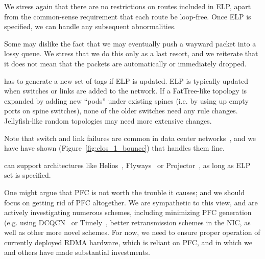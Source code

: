 We stress again that there are no restrictions on routes included in ELP, apart
from the common-sense requirement that each route be loop-free. Once ELP is
specified, we can handle any subsequent abnormalities.

 Some may dislike the fact that we may eventually push
a wayward packet into a lossy queue. We stress that we do this only as a last
resort, and we reiterate that it does not mean that the packets are
automatically or immediately dropped.

 \sysname{} has to generate a new set of tags if ELP is
updated.  ELP is typically updated when switches or links are added to the
network. If a FatTree-like topology is expanded by adding new ``pods'' under
existing spines (i.e. by using up empty ports on spine switches), none of the
older switches need any rule changes.  Jellyfish-like random topologies may need
more extensive changes.

Note that switch and link failures are common in data center
networks~\cite{netpilot}, and we have have shown
(Figure~\ref{fig:clos_1_bounce}) that \sysname{} handles them fine. 

 \sysname{} can support architectures
like Helios~\cite{helios}, Flyways~\cite{flyways} or Projector~\cite{projector},
as long as ELP set is specified.

 One might argue that PFC is not worth the trouble it
causes; and we should focus on getting rid of PFC altogether.  We are
sympathetic to this view, and are actively investigating numerous schemes,
including minimizing PFC generation (e.g.  using DCQCN~\cite{dcqcn} or
Timely~\cite{timely}, better retransmission schemes in the NIC, as well as other
more novel schemes.  For now, we need \sysname{} to ensure proper operation of
currently deployed RDMA hardware, which is reliant on PFC, and in which we and
others have made substantial investments.

